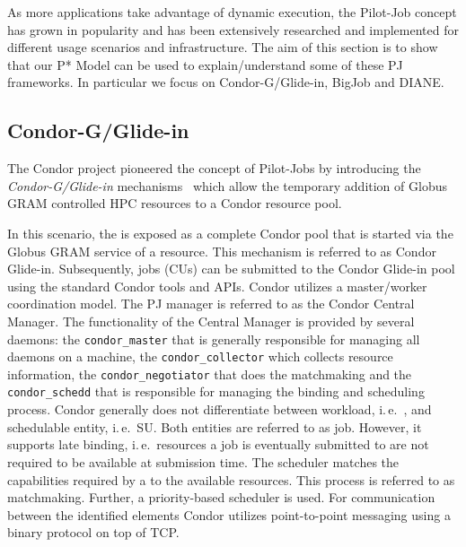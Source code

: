 \documentclass[conference]{IEEEtran}
\begin{document}
As more applications take advantage of dynamic execution, the
Pilot-Job concept has grown in popularity and has been extensively
researched and implemented for different usage scenarios and
infrastructure.  The aim of this section is to show that our P* Model
can be used to explain/understand some of these PJ frameworks. In
particular we focus on Condor-G/Glide-in, BigJob and DIANE.





\subsection{Condor-G/Glide-in}


The Condor project pioneered the concept of Pilot-Jobs by introducing 
the \textit{Condor-G/Glide-in} mechanisms~\cite{condor-g} which allow 
the temporary addition of Globus GRAM controlled HPC resources to a 
Condor resource pool.

In this scenario, the \pilot is exposed as a complete Condor pool that is started 
via the Globus GRAM service of a resource. This mechanism is referred to as Condor
Glide-in. Subsequently, jobs (CUs) can be submitted to the Condor Glide-in pool
using the standard Condor tools and APIs. Condor utilizes a
master/worker coordination model. The PJ manager is referred to as the
Condor Central Manager. The functionality of the Central Manager is
provided by several daemons: the \texttt{condor\_master} that is generally
responsible for managing all daemons on a machine, the
\texttt{condor\_collector} which collects resource information, the
\texttt{condor\_negotiator} that does the matchmaking and the \texttt{condor\_schedd}
that is responsible for managing the binding and scheduling
process. Condor generally does not differentiate between workload,
i.\,e.\ \cu, and schedulable entity, i.\,e.\ SU. Both entities are
referred to as job. However, it supports late binding, i.\,e.\
resources a job is eventually submitted to are not required to be available at
submission time. The scheduler matches the capabilities required by a
\cu to the available resources. This process is referred to as
matchmaking. Further, a priority-based scheduler is used. For
communication between the identified elements Condor utilizes
point-to-point messaging using a binary protocol on top of TCP.
\end{document}
